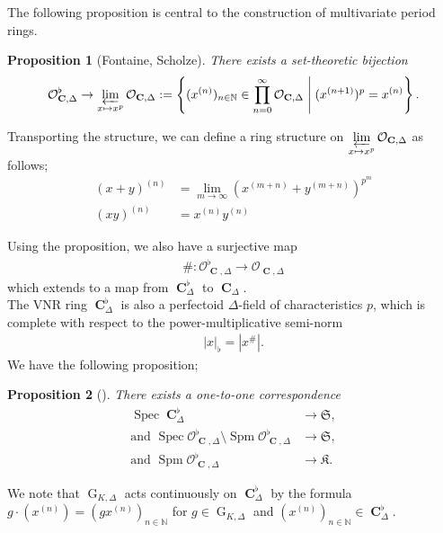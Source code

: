 \documentclass{amsart}
\newtheorem{proposition}{Proposition}[section]
\DeclareMathOperator{\spm}{Spm}
\DeclareMathOperator{\spec}{Spec}
\DeclareMathOperator{\C}{\textbf{C}}
\DeclareMathOperator{\G}{G}
\begin{document}
The following proposition is central to the construction of multivariate period rings.

\begin{proposition}[Fontaine, Scholze]
    There exists a set-theoretic bijection 
    \begin{align*}
        \mathcal{O}^\flat_{\C,\Delta}\to \varprojlim\limits_{x\mapsto x^p}\mathcal{O}_{\C,\Delta}:=\left\{(x^{(n)})_{n\in\mathbb{N}}\in\prod\limits_{n=0}^\infty\mathcal{O}_{\C,\Delta}\;\middle|\;(x^{(n+1)})^p=x^{(n)}\right\}.
    \end{align*}
\end{proposition}
Transporting the structure, we can define a ring structure on $\varprojlim\limits_{x\mapsto x^p}\mathcal{O}_{\C,\Delta}$ as follows; 
\begin{align*}
    (x+y)^{(n)}&=\lim\limits_{m\to \infty}(x^{(m+n)}+y^{(m+n)})^{p^m}\\
    (xy)^{(n)} &=x^{(n)}y^{(n)}
\end{align*}

Using the proposition, we also have a surjective map
\begin{align*}
    \#: \mathcal{O}^\flat_{\C,\Delta}\to \mathcal{O}_{\C,\Delta}
\end{align*}
which extends to a map from $\C^\flat_\Delta$ to $\C_\Delta$.\\

The VNR ring $\C^\flat_\Delta$ is also a perfectoid $\Delta$-field of characteristics $p$, which is complete with respect to the power-multiplicative semi-norm
\begin{align*}
    |x|_\flat=|x^\#|.
\end{align*}
We have the following proposition;

\begin{proposition}[\cite{Pok-Pal}]
    There exists a one-to-one correspondence
    \begin{align*}
        \spec\C^\flat_\Delta&\to \mathfrak{S},\\
        \text{and }\spec\mathcal{O}^\flat_{\C,\Delta}\setminus\spm\mathcal{O}^\flat_{\C,\Delta}&\to \mathfrak{S},\\
      \text{and }  \spm\mathcal{O}^\flat_{\C,\Delta}&\to \mathfrak{K}.
    \end{align*}
\end{proposition}

We note that $\G_{K,\Delta}$ acts continuously on $\C^\flat_\Delta$ by the formula $g\cdot(x^{(n)})=(gx^{(n)})_{n\in\mathbb{N}}$ for $g\in\G_{K,\Delta}$ and $(x^{(n)})_{n\in\mathbb{N}}\in\C^\flat_\Delta$.
\end{document}
